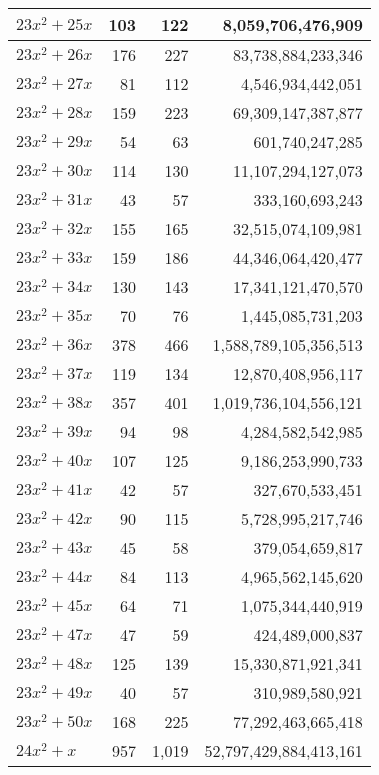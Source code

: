 \documentclass[a4paper]{amsproc}
\theoremstyle{plain}
\begin{document}
\begin{longtable}{ | l | r | r | r | }
$23x^2 + 25x$ & 103 & 122 & 8{,}059{,}706{,}476{,}909 \\ \hline
$23x^2 + 26x$ & 176 & 227 & 83{,}738{,}884{,}233{,}346 \\ \hline
$23x^2 + 27x$ & 81 & 112 & 4{,}546{,}934{,}442{,}051 \\ \hline
$23x^2 + 28x$ & 159 & 223 & 69{,}309{,}147{,}387{,}877 \\ \hline
$23x^2 + 29x$ & 54 & 63 & 601{,}740{,}247{,}285 \\ \hline
$23x^2 + 30x$ & 114 & 130 & 11{,}107{,}294{,}127{,}073 \\ \hline
$23x^2 + 31x$ & 43 & 57 & 333{,}160{,}693{,}243 \\ \hline
$23x^2 + 32x$ & 155 & 165 & 32{,}515{,}074{,}109{,}981 \\ \hline
$23x^2 + 33x$ & 159 & 186 & 44{,}346{,}064{,}420{,}477 \\ \hline
$23x^2 + 34x$ & 130 & 143 & 17{,}341{,}121{,}470{,}570 \\ \hline
$23x^2 + 35x$ & 70 & 76 & 1{,}445{,}085{,}731{,}203 \\ \hline
$23x^2 + 36x$ & 378 & 466 & 1{,}588{,}789{,}105{,}356{,}513 \\ \hline
$23x^2 + 37x$ & 119 & 134 & 12{,}870{,}408{,}956{,}117 \\ \hline
$23x^2 + 38x$ & 357 & 401 & 1{,}019{,}736{,}104{,}556{,}121 \\ \hline
$23x^2 + 39x$ & 94 & 98 & 4{,}284{,}582{,}542{,}985 \\ \hline
$23x^2 + 40x$ & 107 & 125 & 9{,}186{,}253{,}990{,}733 \\ \hline
$23x^2 + 41x$ & 42 & 57 & 327{,}670{,}533{,}451 \\ \hline
$23x^2 + 42x$ & 90 & 115 & 5{,}728{,}995{,}217{,}746 \\ \hline
$23x^2 + 43x$ & 45 & 58 & 379{,}054{,}659{,}817 \\ \hline
$23x^2 + 44x$ & 84 & 113 & 4{,}965{,}562{,}145{,}620 \\ \hline
$23x^2 + 45x$ & 64 & 71 & 1{,}075{,}344{,}440{,}919 \\ \hline
$23x^2 + 47x$ & 47 & 59 & 424{,}489{,}000{,}837 \\ \hline
$23x^2 + 48x$ & 125 & 139 & 15{,}330{,}871{,}921{,}341 \\ \hline
$23x^2 + 49x$ & 40 & 57 & 310{,}989{,}580{,}921 \\ \hline
$23x^2 + 50x$ & 168 & 225 & 77{,}292{,}463{,}665{,}418 \\ \hline
$24x^2 + x$ & 957 & 1{,}019 & 52{,}797{,}429{,}884{,}413{,}161 \\ \hline

\end{longtable}
\end{document}
